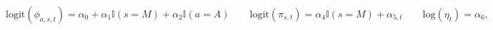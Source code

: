 \begin{equation}
  \text{logit}(\phi_{a, s, t}) = \alpha_{0} + \alpha_{1}\mathbb{I}(s = M) + \alpha_{2}\mathbb{I}(a = A) \qquad
  \text{logit}(\pi_{s, t}) = \alpha_{4} \mathbb{I}(s = M) + \alpha_{5, t} \qquad
  \text{log}(\eta_{t}) = \alpha_{6},
  \label{eqn:parameterisation-info}
\end{equation}